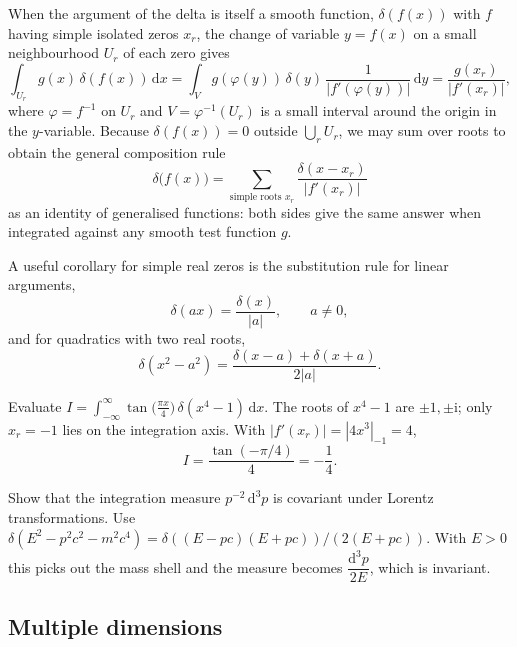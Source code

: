 When the argument of the delta is itself a smooth function, $\delta(f(x))$ with $f$ having simple isolated zeros $x_r$, the change of variable $y=f(x)$ on a small neighbourhood $U_r$ of each zero gives
\begin{equation}
\int_{U_r}g(x)\,\delta(f(x))\,\mathrm{d}x
=\int_V g(\varphi(y))\,\delta(y)\,\frac{1}{|f'(\varphi(y))|}\,\mathrm{d}y
=\frac{g(x_r)}{|f'(x_r)|},
\end{equation}
where $\varphi=f^{-1}$ on $U_r$ and $V=\varphi^{-1}(U_r)$ is a small interval around the origin in the $y$-variable. Because $\delta(f(x))=0$ outside $\bigcup_r U_r$, we may sum over roots to obtain the general composition rule
\begin{equation}
\boxed{\;\delta\bigl(f(x)\bigr)=\sum_{\text{simple roots }x_r}\frac{\delta(x-x_r)}{|f'(x_r)|}\;}
\end{equation}
as an identity of generalised functions: both sides give the same answer when integrated against any smooth test function $g$.

A useful corollary for simple real zeros is the substitution rule for linear arguments,
\begin{equation}
\delta(ax)=\frac{\delta(x)}{|a|},\qquad a\neq 0,
\end{equation}
and for quadratics with two real roots,
\begin{equation}
\delta(x^2-a^2)=\frac{\delta(x-a)+\delta(x+a)}{2|a|}.
\end{equation}

\begin{example}
Evaluate $I=\displaystyle\int_{-\infty}^{\infty}\tan\!\bigl(\tfrac{\pi x}{4}\bigr)\,\delta(x^4-1)\,\mathrm{d}x$.
The roots of $x^4-1$ are $\pm 1,\pm\mathrm{i}$; only $x_r=-1$ lies on the integration axis. With $|f'(x_r)|=|4x^3|_{-1}=4$,
\begin{equation}
I=\frac{\tan(-\pi/4)}{4}=-\frac{1}{4}.
\end{equation}
\end{example}

\begin{example}
Show that the integration measure $p^{-2}\,\mathrm{d}^3 p$ is covariant under Lorentz transformations. Use $\delta(E^2-p^2c^2-m^2c^4)=\delta((E-pc)(E+pc))/(2(E+pc))$. With $E>0$ this picks out the mass shell and the measure becomes $\dfrac{\mathrm{d}^3 p}{2E}$, which is invariant.
\end{example}

\subsection{Multiple dimensions}

